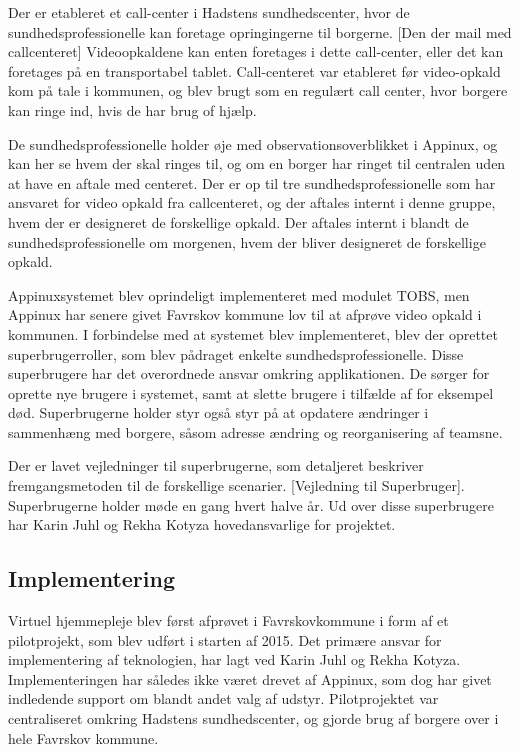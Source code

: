 Der er etableret et call-center i Hadstens sundhedscenter, hvor de sundhedsprofessionelle kan foretage opringingerne til borgerne. [Den der mail med callcenteret] Videoopkaldene kan enten foretages i dette call-center, eller det kan foretages på en transportabel tablet. Call-centeret var etableret før video-opkald kom på tale i kommunen, og blev brugt som en regulært call center, hvor borgere kan ringe ind, hvis de har brug of hjælp.

De sundhedsprofessionelle holder øje med observationsoverblikket i Appinux, og kan her se hvem der skal ringes til, og om en borger har ringet til centralen uden at have en aftale med centeret. Der er op til tre sundhedsprofessionelle som har ansvaret for video opkald fra callcenteret, og der aftales internt i denne gruppe, hvem der er designeret de forskellige opkald.  Der aftales internt i blandt de sundhedsprofessionelle om morgenen, hvem der bliver designeret de forskellige opkald.

Appinuxsystemet blev oprindeligt implementeret med modulet TOBS, men Appinux har senere givet Favrskov kommune lov til at afprøve video opkald i kommunen. I forbindelse med at systemet blev implementeret, blev der oprettet superbrugerroller, som blev pådraget enkelte sundhedsprofessionelle. Disse superbrugere har det overordnede ansvar omkring applikationen. De sørger for oprette nye brugere i systemet, samt at slette brugere i tilfælde af for eksempel død. Superbrugerne holder styr også styr på at opdatere ændringer i sammenhæng med borgere, såsom adresse ændring og reorganisering af teamsne.

Der er lavet vejledninger til superbrugerne, som detaljeret beskriver fremgangsmetoden til de forskellige scenarier. [Vejledning til Superbruger]. Superbrugerne holder møde en gang hvert halve år. Ud over disse superbrugere har Karin Juhl og Rekha Kotyza hovedansvarlige for projektet. 

\subsection{Implementering}
Virtuel hjemmepleje blev først afprøvet i Favrskovkommune i form af et pilotprojekt, som blev udført i starten af 2015. Det primære ansvar for implementering af teknologien, har lagt ved Karin Juhl og Rekha Kotyza. Implementeringen har således ikke været drevet af Appinux, som dog har givet indledende support om blandt andet valg af udstyr. Pilotprojektet var centraliseret omkring Hadstens sundhedscenter, og gjorde brug af borgere over i hele Favrskov kommune. 

